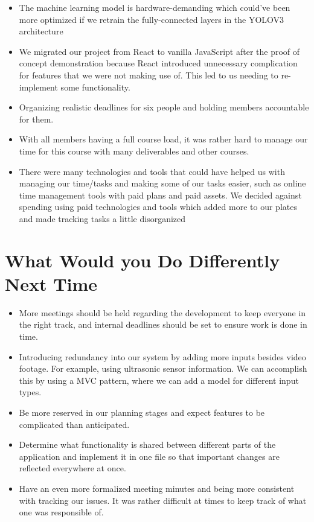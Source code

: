 \documentclass{article}
\begin{document}
  \begin{itemize}
      \item The machine learning model is hardware-demanding which could've been
      more optimized if we retrain the fully-connected layers in the YOLOV3
      architecture
      \item We migrated our project from React to vanilla JavaScript after the
      proof of concept demonstration because React introduced unnecessary
      complication for features that we were not making use of. This led to us
      needing to re-implement some functionality.
      \item Organizing realistic deadlines for six people and holding members
      accountable for them.
      \item With all members having a full course load, it was rather hard to
      manage our time for this course with many deliverables and other courses. 
      \item There were many technologies and tools that could have helped us
      with managing our time/tasks and making some of our tasks easier, such as
      online time management tools with paid plans and paid assets. We decided
      against spending using paid technologies and tools which added more to our
      plates and made tracking tasks a little disorganized
  \end{itemize}

\section{What Would you Do Differently Next Time}
\begin{itemize}
    \item More meetings should be held regarding the development to keep
    everyone in the right track, and internal deadlines should be set to ensure
    work is done in time.
    \item Introducing redundancy into our system by adding more inputs besides
    video footage. For example, using ultrasonic sensor information. We can
    accomplish this by using a MVC pattern, where we can add a model for
    different input types.
    \item Be more reserved in our planning stages and expect features to be
    complicated than anticipated.
    \item Determine what functionality is shared between different parts of the
    application and implement it in one file so that important changes are
    reflected everywhere at once.
    \item Have an even more formalized meeting minutes and being more consistent
    with tracking our issues. It was rather difficult at times to keep track of
    what one was responsible of.
\end{itemize}
\end{document}

